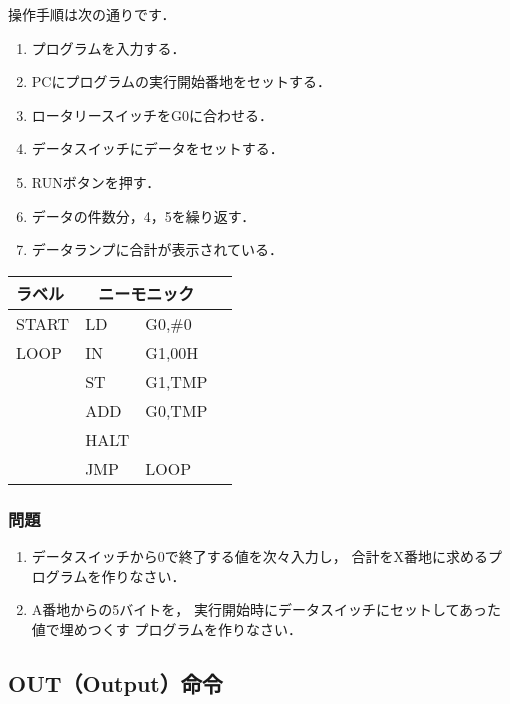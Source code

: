 操作手順は次の通りです．

\begin{enumerate}
\item プログラムを入力する．
\item PCにプログラムの実行開始番地をセットする．
\item ロータリースイッチをG0に合わせる．
\item データスイッチにデータをセットする．
\item RUNボタンを押す．
\item データの件数分，4，5を繰り返す．
\item データランプに合計が表示されている．
\end{enumerate}

{\ttfamily\small\begin{center}
  \begin{tabular}{|l|l l|l}
    \cline{1-3}
    ラベル & \multicolumn{2}{|c|}{ニーモニック} \\
    \hline
    START & LD   & G0,\#0        \\
    LOOP  & IN   & G1,00H        \\
    & ST   & G1,TMP        \\
    & ADD  & G0,TMP        \\
    & HALT &               \\
    & JMP  & LOOP          \\ 
    \hline
  \end{tabular}
\end{center}}

\vfill
\subsubsection{問題}
\begin{enumerate}
\item データスイッチから0で終了する値を次々入力し，
  合計をX番地に求めるプログラムを作りなさい．
\item A番地からの5バイトを，
  実行開始時にデータスイッチにセットしてあった値で埋めつくす
  プログラムを作りなさい．
\end{enumerate}
\vfill

\subsection{OUT（Output）命令}
\label{out}

